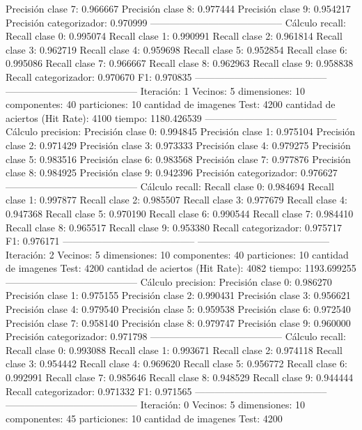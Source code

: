 Precisión clase 7: 0.966667
Precisión clase 8: 0.977444
Precisión clase 9: 0.954217
Precisión categorizador: 0.970999
-----------------------------------------
Cálculo recall: 
Recall clase 0: 0.995074
Recall clase 1: 0.990991
Recall clase 2: 0.961814
Recall clase 3: 0.962719
Recall clase 4: 0.959698
Recall clase 5: 0.952854
Recall clase 6: 0.995086
Recall clase 7: 0.966667
Recall clase 8: 0.962963
Recall clase 9: 0.958838
Recall categorizador: 0.970670
F1: 0.970835
-----------------------------------------
-----------------------------------------
Iteración: 1
Vecinos: 5
dimensiones: 10
componentes: 40
particiones: 10
cantidad de imagenes Test: 4200
cantidad de aciertos (Hit Rate): 4100
tiempo: 1180.426539
-----------------------------------------
Cálculo precision: 
Precisión clase 0: 0.994845
Precisión clase 1: 0.975104
Precisión clase 2: 0.971429
Precisión clase 3: 0.973333
Precisión clase 4: 0.979275
Precisión clase 5: 0.983516
Precisión clase 6: 0.983568
Precisión clase 7: 0.977876
Precisión clase 8: 0.984925
Precisión clase 9: 0.942396
Precisión categorizador: 0.976627
-----------------------------------------
Cálculo recall: 
Recall clase 0: 0.984694
Recall clase 1: 0.997877
Recall clase 2: 0.985507
Recall clase 3: 0.977679
Recall clase 4: 0.947368
Recall clase 5: 0.970190
Recall clase 6: 0.990544
Recall clase 7: 0.984410
Recall clase 8: 0.965517
Recall clase 9: 0.953380
Recall categorizador: 0.975717
F1: 0.976171
-----------------------------------------
-----------------------------------------
Iteración: 2
Vecinos: 5
dimensiones: 10
componentes: 40
particiones: 10
cantidad de imagenes Test: 4200
cantidad de aciertos (Hit Rate): 4082
tiempo: 1193.699255
-----------------------------------------
Cálculo precision: 
Precisión clase 0: 0.986270
Precisión clase 1: 0.975155
Precisión clase 2: 0.990431
Precisión clase 3: 0.956621
Precisión clase 4: 0.979540
Precisión clase 5: 0.959538
Precisión clase 6: 0.972540
Precisión clase 7: 0.958140
Precisión clase 8: 0.979747
Precisión clase 9: 0.960000
Precisión categorizador: 0.971798
-----------------------------------------
Cálculo recall: 
Recall clase 0: 0.993088
Recall clase 1: 0.993671
Recall clase 2: 0.974118
Recall clase 3: 0.954442
Recall clase 4: 0.969620
Recall clase 5: 0.956772
Recall clase 6: 0.992991
Recall clase 7: 0.985646
Recall clase 8: 0.948529
Recall clase 9: 0.944444
Recall categorizador: 0.971332
F1: 0.971565
-----------------------------------------
-----------------------------------------
Iteración: 0
Vecinos: 5
dimensiones: 10
componentes: 45
particiones: 10
cantidad de imagenes Test: 4200
